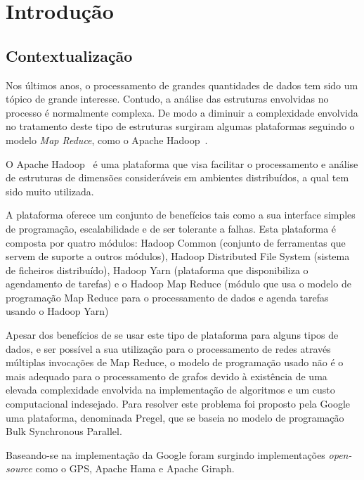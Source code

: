 \chapter{Introdução}

\section{Contextualização}
Nos últimos anos, o processamento de grandes quantidades de dados tem sido um tópico de grande interesse. Contudo, a análise das estruturas envolvidas no processo 
é normalmente complexa. De modo a diminuir a complexidade envolvida no tratamento deste tipo de estruturas surgiram algumas plataformas seguindo o modelo \textit{Map Reduce}, como o Apache Hadoop~\cite{hadoop}.

O Apache Hadoop~\cite{hadoop} é uma plataforma que visa facilitar o processamento e análise de estruturas de dimensões consideráveis em ambientes distribuídos, a qual tem sido muito utilizada.

A plataforma oferece um conjunto de benefícios tais como a sua interface simples de programação, escalabilidade e de ser tolerante a falhas.
Esta plataforma é composta por quatro módulos:
Hadoop Common (conjunto de ferramentas que servem de suporte a outros módulos),
Hadoop Distributed File System (sistema de ficheiros distribuído),
Hadoop Yarn (plataforma que disponibiliza o agendamento de tarefas)
e o Hadoop Map Reduce (módulo que usa o modelo de programação Map Reduce para o processamento de dados e agenda tarefas usando o Hadoop Yarn)

Apesar dos benefícios de se usar este tipo de plataforma para alguns tipos de dados, e ser possível a sua utilização para o processamento de redes através múltiplas invocações de Map Reduce, o modelo de programação usado  não é o mais adequado para o processamento de grafos devido à existência de  uma elevada complexidade envolvida na implementação de algoritmos e um custo computacional indesejado.
Para resolver este problema foi proposto pela Google uma plataforma, denominada Pregel\cite{pregel}, que se baseia no modelo de programação Bulk Synchronous Parallel\cite{bsp}.

Baseando-se na implementação da Google foram surgindo implementações \textit{open-source} como o GPS\cite{docgps}, Apache Hama\cite{hama} e Apache Giraph\cite{giraph}.


